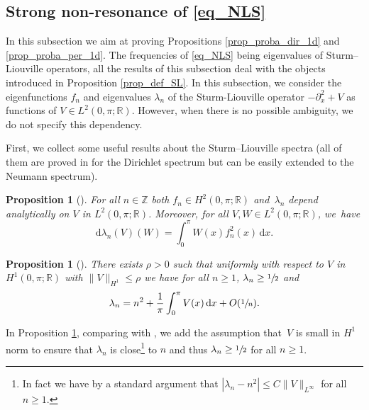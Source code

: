 \documentclass[11pt]{article}
\newtheorem{proposition}[theorem]{Proposition}
\theoremstyle{definition}
\begin{document}
\subsection{Strong non-resonance of \eqref{eq_NLS}} In this subsection we aim at proving Propositions \ref{prop_proba_dir_1d} and \ref{prop_proba_per_1d}. The frequencies of \eqref{eq_NLS} being eigenvalues of Sturm--Liouville operators, all the results of this subsection deal with the objects introduced in Proposition \ref{prop_def_SL}. In this subsection, we consider the eigenfunctions $f_n$ and eigenvalues $\lambda_n$ of the Sturm-Liouville operator $-\partial_x^2 +V$ as functions of $V \in L^2(0,\pi;\mathbb{R})$. However, when there is no possible ambiguity, we do not specify this dependency.

First, we collect some useful results about the Sturm--Liouville spectra (all of them are proved in \cite{PT} for the Dirichlet spectrum but can be easily extended to the Neumann spectrum).
\begin{proposition}[{\cite[Th.\,3, p.\,31]{PT}}] \label{prop_smooth_spec} For all $n\in \mathbb{Z}$ both $f_n \in H^2(0,\pi;\mathbb{R})$ and~$\lambda_n$ depend analytically on $V$ in $L^2(0,\pi;\mathbb{R})$. Moreover, for all $V,W \in L^2(0,\pi;\mathbb{R})$, we~have%
\begin{equation}
\label{eq_diff_lambda}
\mathrm{d} \lambda_n (V)(W) = \int_0^\pi W(x) f_n^2(x) \, \mathrm{d}x.
\end{equation}
\end{proposition}

\begin{proposition}[{\cite[Th.\,4, p.\,35]{PT}}]
\label{prop_it_acumulates} {There exists $\rho>0$ such that} uniformly with respect to $V$ in $H^1(0,\pi;\mathbb{R})$ with
$\|V\|_{H^1}\leq \rho$
we have for all $n\geq1$, $\lambda_n \geq\sfrac12$ and
\[
\lambda_n = n^2 + \frac1\pi \int_{0}^{\pi} V(x)\, \mathrm{d}x + O(\sfrac1n).
\]
\end{proposition}
In Proposition \ref{prop_it_acumulates}, comparing with \cite[Th.\,4 p.\,35]{PT}, we add the assumption that~$V$ is small in $H^1$ norm to ensure that $\lambda_n$ is close\footnote{In fact we have by a standard argument that $|\lambda_n -n^2|\leq C\| V\|_{L^\infty}$ for all $n\geq1$.} to $n$ and thus $\lambda_n \geq\sfrac12$ for all $n\geq1$.
\end{document}
